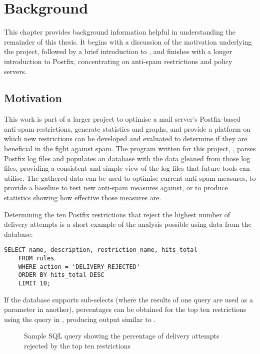 \chapter{Background}

\label{background}

This chapter provides background information helpful in understanding the
remainder of this thesis.  It begins with a discussion of the motivation
underlying the project, followed by a brief introduction to ,
and finishes with a longer introduction to Postfix, concentrating on
anti-spam restrictions and policy servers.

\section{Motivation}

\label{motivation}

This work is part of a larger project to optimise a mail server's
Postfix-based anti-spam restrictions, generate statistics and graphs, and
provide a platform on which new restrictions can be developed and evaluated to determine
if they are beneficial in the fight against spam.  The program written for
this project, \parsername{}, parses Postfix log files and populates an
database with the data gleaned from those log files, providing a consistent
and simple view of the log files that future tools can utilise.  The
gathered data can be used to optimise current anti-spam measures, to
provide a baseline to test new anti-spam measures against, or to produce
statistics showing how effective those measures are.

Determining the ten Postfix restrictions that reject the highest number of
delivery attempts is a short example of the analysis possible using data
from the database:

\begin{verbatim}
SELECT name, description, restriction_name, hits_total
    FROM rules
    WHERE action = 'DELIVERY_REJECTED'
    ORDER BY hits_total DESC
    LIMIT 10;
\end{verbatim}

If the database supports sub-selects (where the results of one query are
used as a parameter in another), percentages can be obtained for the top
ten restrictions using the query in , producing
output similar to .

\begin{figure}[thbp]
    \caption{Sample SQL query showing the percentage of delivery attempts
    rejected by the top ten restrictions}
    \empty{}\label{Sample SQL query}
    
\end{figure}

